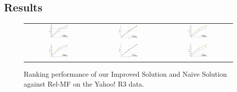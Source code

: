 \documentclass[sigconf]{acmart}
\begin{document}
\subsection{Results}
\begin{figure}[!htb]
	\begin{center}
		\begin{tabular}{ccc}
			\includegraphics[width=0.3\textwidth]{fig/DCG_all.eps} &
			\includegraphics[width=0.3\textwidth]{fig/Recall_all.eps} & \includegraphics[width=0.3\textwidth]{fig/MAP_all.eps}	\\
			\includegraphics[width=0.3\textwidth]{fig/DCG_rare.eps} &
			\includegraphics[width=0.3\textwidth]{fig/Recall_rare.eps} & \includegraphics[width=0.3\textwidth]{fig/MAP_rare.eps}
		\end{tabular}
	\end{center}
	\caption{Ranking performance of our Improved Solution and Naive Solution against Rel-MF on the Yahoo! R3 data.}
	\label{fig:comparisonPerformance}
\end{figure}
\end{document}
